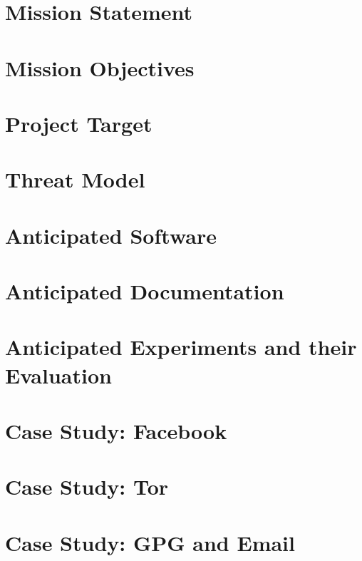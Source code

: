 \chapter{Mission Statement}


\chapter{Mission Objectives}


\chapter{Project Target}


\chapter{Threat Model}


\chapter{Anticipated Software}


\chapter{Anticipated Documentation}


\chapter{Anticipated Experiments and their Evaluation}


\chapter{Case Study: Facebook}


\chapter{Case Study: Tor}


\chapter{Case Study: GPG and Email}


